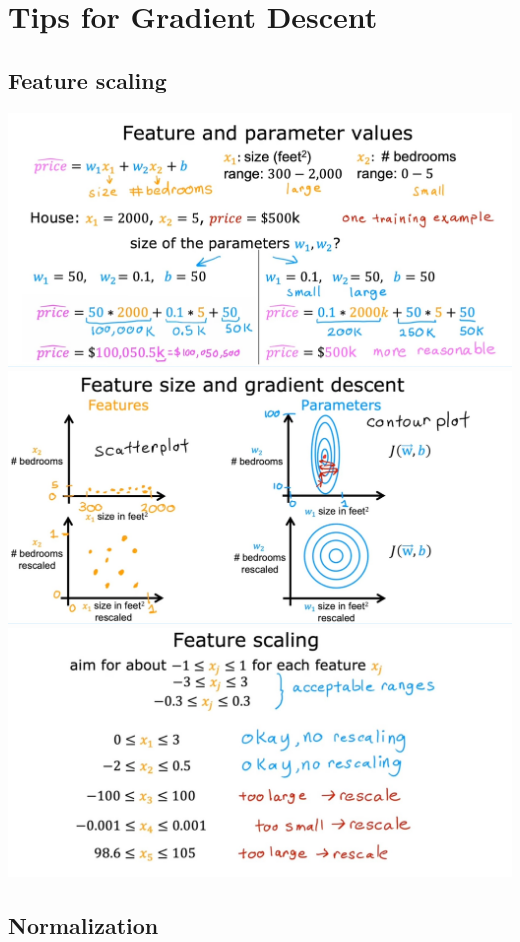 \chapter{Tips for Gradient Descent}
\section{Feature scaling}
\includegraphics*[width=\textwidth]{images/2.4 (8)}
\vspace{2em}
\includegraphics*[width=\textwidth]{images/2.4 (7)}
\includegraphics*[width=\textwidth]{images/2.4 (4)}

\section{Normalization}

